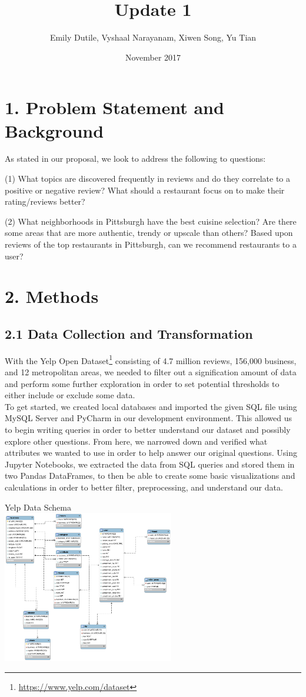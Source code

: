 \documentclass{neu_handout}
\title{Update 1}
\author{Emily Dutile, Vyshaal Narayanam, Xiwen Song, Yu Tian}
\date{November 2017}
\begin{document}
\section*{1. Problem Statement and Background}
As stated in our proposal, we look to address the following to questions:

(1) What topics are discovered frequently in reviews and do they correlate to a positive or negative review? What should a restaurant focus on to make their rating/reviews better?

(2) What neighborhoods in Pittsburgh have the best cuisine selection? Are there some areas that are more authentic, trendy or upscale than others? Based upon reviews of the top restaurants in Pittsburgh, can we recommend restaurants to a user?

\section*{2. Methods}

\subsection*{2.1 Data Collection and Transformation}
With the Yelp Open Dataset\footnote{\url{https://www.yelp.com/dataset}} consisting of 4.7 million reviews, 156,000 business, and 12 metropolitan areas, we needed to filter out a signification amount of data and perform some further exploration in order to set potential thresholds to either include or exclude some data.\\
To get started, we created local databases and imported the given SQL file using MySQL Server and PyCharm in our development environment. This allowed us to begin writing queries in order to better understand our dataset and possibly explore other questions. From here, we narrowed down and verified what attributes we wanted to use in order to help answer our original questions.  Using Jupyter Notebooks, we extracted the data from SQL queries and stored them in two Pandas DataFrames, to then be able to create some basic visualizations and calculations in order to better filter, preprocessing, and understand our data.\\

\begin{center}
Yelp Data Schema\\
\includegraphics[width=75mm,scale=0.4]{schema}\\
\end{center}
\end{document}
